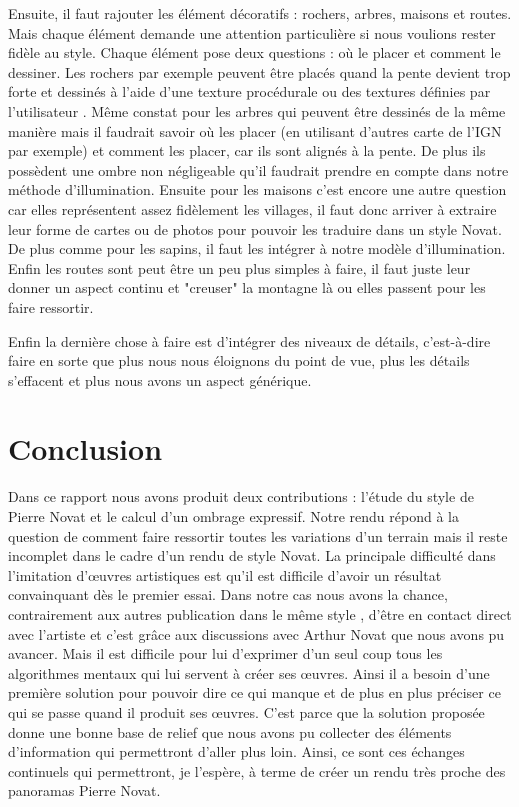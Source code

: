 Ensuite, il faut rajouter les élément décoratifs : rochers, arbres, maisons et routes. Mais chaque élément demande une attention particulière si nous voulions rester fidèle au style. Chaque élément pose deux questions : où le placer et comment le dessiner. Les rochers par exemple peuvent être placés quand la pente devient trop forte et dessinés à l'aide d'une texture procédurale  \cite{perlin2002improving}  ou des textures définies par l'utilisateur \cite{loi2015programmable}. Même constat pour les arbres qui peuvent être dessinés de la même manière mais il faudrait savoir où les placer (en utilisant d'autres carte de l'IGN par exemple) et comment les placer, car ils sont alignés à la pente. De plus ils possèdent une ombre non négligeable qu'il faudrait prendre en compte dans notre méthode d'illumination. Ensuite pour les maisons c'est encore une autre question car elles représentent assez fidèlement les villages, il faut donc arriver à extraire leur forme de cartes ou de photos pour pouvoir les traduire dans un style Novat. De plus comme pour les sapins, il faut les intégrer à notre modèle d'illumination. Enfin les routes sont peut être un peu plus simples à faire, il faut juste leur donner un aspect continu et "creuser" la montagne là ou elles passent pour les faire ressortir. 

Enfin la dernière chose à faire est d'intégrer des niveaux de détails, c'est-à-dire faire en sorte que plus nous nous éloignons du point de vue, plus les détails s'effacent et plus nous avons un aspect générique. 


\section{Conclusion}
Dans ce rapport nous avons produit deux contributions : l'étude du style de Pierre Novat et le calcul d'un ombrage expressif. Notre rendu répond à la question de comment faire ressortir toutes les variations d'un terrain mais il reste incomplet dans le cadre d'un rendu de style Novat. La principale difficulté dans l'imitation d’œuvres artistiques est qu'il est difficile d'avoir un résultat convainquant dès le premier essai. Dans notre cas nous avons la chance, contrairement aux autres publication dans le même style \cite{bratkova2009artistic}\cite{brown2017real}, d'être en contact direct avec l'artiste et c'est grâce aux discussions avec Arthur Novat que nous avons pu avancer. Mais il est difficile pour lui d'exprimer d'un seul coup tous les algorithmes mentaux qui lui servent à créer ses œuvres. Ainsi il a besoin d'une première solution pour pouvoir dire ce qui manque et de plus en plus préciser ce qui se passe quand il produit ses œuvres. C'est parce que la solution proposée donne une bonne base de relief que nous avons pu collecter des éléments d'information qui permettront d'aller plus loin. Ainsi, ce sont ces échanges continuels qui permettront,  je l'espère, à terme de créer un rendu très proche des panoramas Pierre Novat. 

    